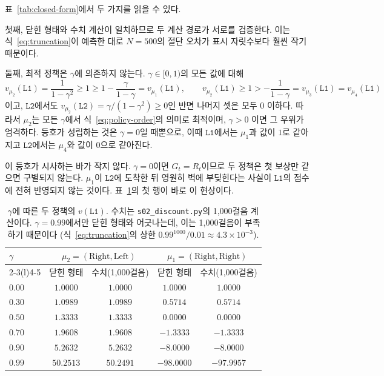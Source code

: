 \documentclass[11pt,a4paper]{article}
\begin{document}
표~\ref{tab:closed-form}에서 두 가지를 읽을 수 있다.

첫째, 닫힌 형태와 수치 계산이 일치하므로 두 계산 경로가 서로를 검증한다. 이는
식~\eqref{eq:truncation}이 예측한 대로 $N=500$의 절단 오차가 표시 자릿수보다 훨씬 작기 때문이다.

둘째, 최적 정책은 $\gamma$에 의존하지 않는다. $\gamma\in[0,1)$의 모든 값에 대해
\begin{equation}
  v_{\mu_2}(\texttt{L1}) = \frac{1}{1-\gamma^2} \ge 1 \ge 1-\frac{\gamma}{1-\gamma} = v_{\mu_1}(\texttt{L1}),
  \qquad
  v_{\mu_2}(\texttt{L1}) \ge 1 > -\frac{1}{1-\gamma} = v_{\mu_3}(\texttt{L1}) = v_{\mu_4}(\texttt{L1})
\end{equation}
이고, $\texttt{L2}$에서도 $v_{\mu_2}(\texttt{L2})=\gamma/(1-\gamma^2)\ge 0$인 반면 나머지 셋은 모두
$0$ 이하다. 따라서 $\mu_2$는 모든 $\gamma$에서 식~\eqref{eq:policy-order}의 의미로 최적이며, $\gamma>0$
이면 그 우위가 엄격하다. 등호가 성립하는 것은 $\gamma=0$일 때뿐으로, 이때
$\texttt{L1}$에서는 $\mu_1$과 값이 $1$로 같아지고 $\texttt{L2}$에서는 $\mu_4$와 값이 $0$으로 같아진다.

이 등호가 시사하는 바가 작지 않다. $\gamma=0$이면 $G_t=R_t$이므로 두 정책은 첫 보상만 같으면 구별되지
않는다. $\mu_1$이 $\texttt{L2}$에 도착한 뒤 영원히 벽에 부딪힌다는 사실이 $\texttt{L1}$의 점수에 전혀
반영되지 않는 것이다. 표~\ref{tab:gamma-sweep}의 첫 행이 바로 이 현상이다.

\begin{table}[htbp]
\centering
\caption{$\gamma$에 따른 두 정책의 $v(\texttt{L1})$. 수치는 \texttt{s02\_discount.py}의 1,000걸음
계산이다. $\gamma=0.99$에서만 닫힌 형태와 어긋나는데, 이는 1,000걸음이 부족하기 때문이다
(식~\eqref{eq:truncation}의 상한 $0.99^{1000}/0.01\approx4.3\times10^{-3}$).}
\label{tab:gamma-sweep}
\small
\begin{tabular}{@{}lcccc@{}}
\toprule
\multirow{2}{*}{$\gamma$} & \multicolumn{2}{c}{$\mu_2=(\text{Right},\text{Left})$}
& \multicolumn{2}{c}{$\mu_1=(\text{Right},\text{Right})$} \\
\cmidrule(lr){2-3}\cmidrule(l){4-5}
& 닫힌 형태 & 수치(1,000걸음) & 닫힌 형태 & 수치(1,000걸음) \\
\midrule
$0.00$ & $1.0000$  & $1.0000$  & $1.0000$  & $1.0000$  \\
$0.30$ & $1.0989$  & $1.0989$  & $0.5714$  & $0.5714$  \\
$0.50$ & $1.3333$  & $1.3333$  & $0.0000$  & $0.0000$  \\
$0.70$ & $1.9608$  & $1.9608$  & $-1.3333$ & $-1.3333$ \\
$0.90$ & $5.2632$  & $5.2632$  & $-8.0000$ & $-8.0000$ \\
$0.99$ & $50.2513$ & $50.2491$ & $-98.0000$& $-97.9957$\\
\bottomrule
\end{tabular}
\end{table}
\end{document}
